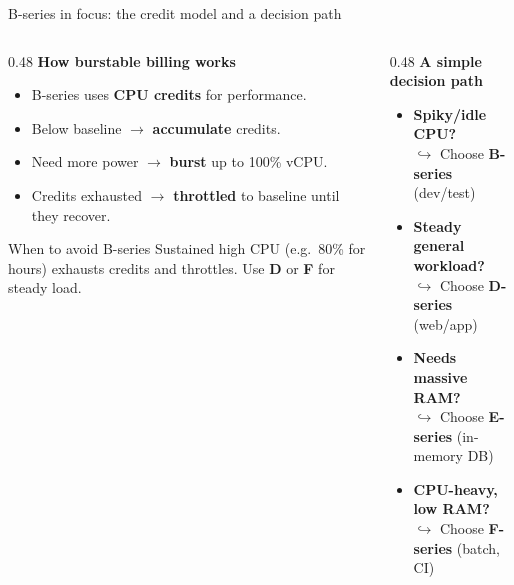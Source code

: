 \documentclass[aspectratio=169,xcolor=dvipsnames]{beamer}
\begin{document}
\begin{frame}[shrink=15]{B-series in focus: the credit model and a decision path}
	\begin{columns}[T]
		\begin{column}{0.48\textwidth}
			\vspace{0.2cm}
			\textbf{\large How burstable billing works}
			
			\vspace{0.3cm}
			\begin{itemize}
				\setlength{\itemsep}{0.8em}
				\item B-series uses \textbf{CPU credits} for performance.
				\item Below baseline $\rightarrow$ \textbf{accumulate} credits.
				\item Need more power $\rightarrow$ \textbf{burst} up to 100\% vCPU.
				\item Credits exhausted $\rightarrow$ \textbf{throttled} to baseline until they recover.
			\end{itemize}
			
			\vspace{0.4cm}
			\begin{exampleblock}{When to avoid B-series}
				Sustained high CPU (e.g.\ 80\% for hours) exhausts credits and throttles. Use \textbf{D} or \textbf{F} for steady load.
			\end{exampleblock}
		\end{column}
		
		\begin{column}{0.48\textwidth}
			\vspace{0.2cm}
			\textbf{\large A simple decision path}
			
			\vspace{0.3cm}
			\begin{itemize}
				\setlength{\itemsep}{0.8em}
				\item \textbf{Spiky/idle CPU?} \\
				$\hookrightarrow$ Choose \textbf{B-series} (dev/test)
				
				\item \textbf{Steady general workload?} \\
				$\hookrightarrow$ Choose \textbf{D-series} (web/app)
				
				\item \textbf{Needs massive RAM?} \\
				$\hookrightarrow$ Choose \textbf{E-series} (in-memory DB)
				
				\item \textbf{CPU-heavy, low RAM?} \\
				$\hookrightarrow$ Choose \textbf{F-series} (batch, CI)
				

\end{itemize}
\end{column}
\end{columns}
\end{frame}
\end{document}
